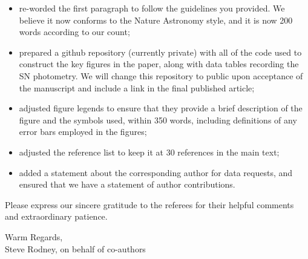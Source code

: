 \documentclass[11pt]{article}
\begin{document}
\begin{itemize}
\item{re-worded the first paragraph to follow the guidelines you provided.  We believe it now conforms to the Nature Astronomy style, and it is now 200 words according to our count;}
\item{%
prepared a github repository (currently private) with all of the code used to construct the key figures in the paper, along with data tables recording the SN photometry.  We will change  this repository to public upon acceptance of the manuscript and include a link in the final published article;}
\item{adjusted figure legends to ensure that they provide a brief description of the figure and the symbols used, within 350 words, including definitions of any error bars employed in the figures;}
\item{adjusted the reference list to keep it at 30 references in the main text;}
\item{added a statement about the corresponding author for data requests, and ensured that we have a statement of author contributions.}
\end{itemize}

Please express our sincere gratitude to the referees for their helpful comments and extraordinary patience.

\bigskip

\noindent Warm Regards,\\
\smallskip
Steve Rodney, on behalf of co-authors
\end{document}
